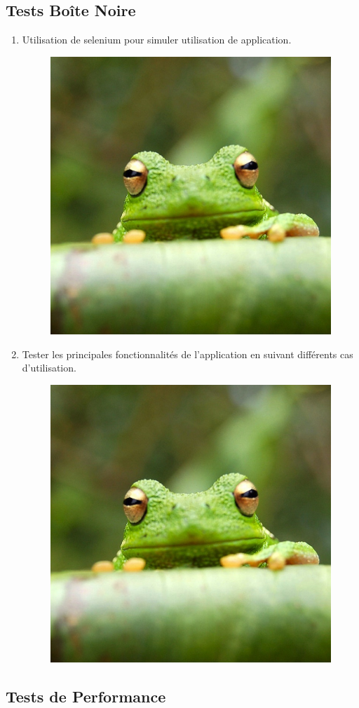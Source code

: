 \documentclass{article}
\begin{document}
\subsection{Tests Boîte Noire}

\begin{enumerate}
    \item Utilisation de selenium pour simuler utilisation de application.
    \begin{figure}[H]
        \centering
        \includegraphics[width=0.5\linewidth]{assets/frog.jpg}
        \end{figure}
    \item Tester les principales fonctionnalités de l’application en suivant différents cas d’utilisation.
    \begin{figure}[H]
        \centering
        \includegraphics[width=0.5\linewidth]{assets/frog.jpg}
        \end{figure}
\end{enumerate}

\subsection{Tests de Performance}
\end{document}
